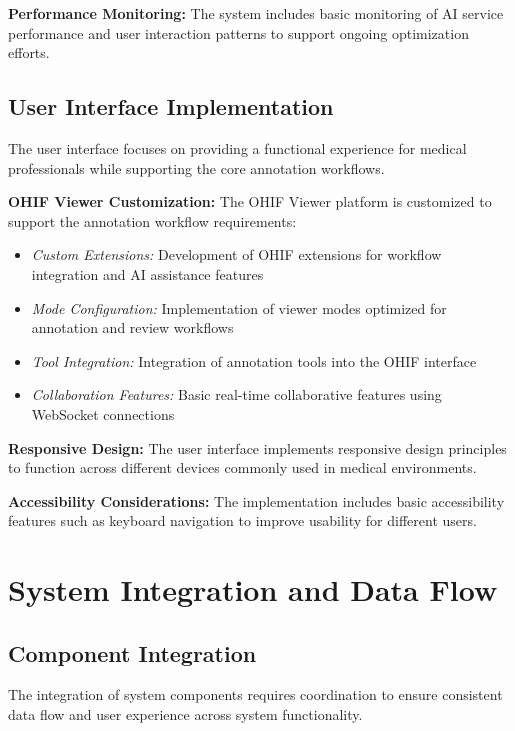 \textbf{Performance Monitoring:} The system includes basic monitoring of AI service performance and user interaction patterns to support ongoing optimization efforts.

\subsection{User Interface Implementation}

The user interface focuses on providing a functional experience for medical professionals while supporting the core annotation workflows.

\textbf{OHIF Viewer Customization:} The OHIF Viewer platform \cite{ziegler2020open} is customized to support the annotation workflow requirements:

\begin{itemize}
    \item \textit{Custom Extensions:} Development of OHIF extensions for workflow integration and AI assistance features
    \item \textit{Mode Configuration:} Implementation of viewer modes optimized for annotation and review workflows
    \item \textit{Tool Integration:} Integration of annotation tools into the OHIF interface
    \item \textit{Collaboration Features:} Basic real-time collaborative features using WebSocket connections
\end{itemize}

\textbf{Responsive Design:} The user interface implements responsive design principles to function across different devices commonly used in medical environments.

\textbf{Accessibility Considerations:} The implementation includes basic accessibility features such as keyboard navigation to improve usability for different users.

\section{System Integration and Data Flow}

\subsection{Component Integration}

The integration of system components requires coordination to ensure consistent data flow and user experience across system functionality.

